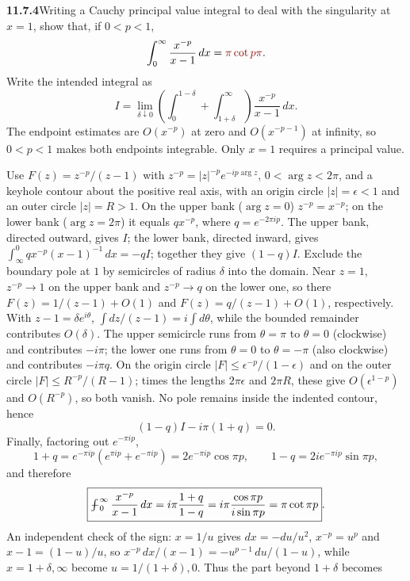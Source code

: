 \par\bigskip
\noindent\textbf{11.7.4}\quad Writing a Cauchy principal value integral to
deal with the singularity at $x=1$, show that, if $0 < p < 1$,
\[
\int_{0}^{\infty}\frac{x^{-p}}{x-1}\,dx=\erratum{\pi\cot p\pi}.
\]
\solution
{}
Write the intended integral as
\[
I=\lim_{\delta\downarrow0}
\left(\int_0^{1-\delta}+\int_{1+\delta}^{\infty}\right)
\frac{x^{-p}}{x-1}\,dx.
\]
The endpoint estimates are $O(x^{-p})$ at zero and $O(x^{-p-1})$
at infinity, so $0<p<1$ makes both endpoints integrable. Only $x=1$
requires a principal value.

Use $F(z)=z^{-p}/(z-1)$ with $z^{-p}=|z|^{-p}e^{-ip\arg z}$,
$0<\arg z<2\pi$, and a keyhole contour about the positive real axis,
with an origin circle $|z|=\epsilon<1$ and an outer circle $|z|=R>1$.
On the upper bank ($\arg z=0$) $z^{-p}=x^{-p}$; on the lower bank
($\arg z=2\pi$) it equals $q x^{-p}$, where $q=e^{-2\pi ip}$.
The upper bank, directed outward, gives $I$; the lower bank, directed
inward, gives $\int_\infty^0 qx^{-p}(x-1)^{-1}\,dx=-qI$; together they
give $(1-q)I$. Exclude the boundary pole at $1$ by semicircles of
radius $\delta$ into the domain. Near $z=1$, $z^{-p}\to1$ on the upper
bank and $z^{-p}\to q$ on the lower one, so there
$F(z)=1/(z-1)+O(1)$ and $F(z)=q/(z-1)+O(1)$, respectively. With
$z-1=\delta e^{i\theta}$, $\int dz/(z-1)=i\int d\theta$, while the
bounded remainder contributes $O(\delta)$. The upper semicircle runs
from $\theta=\pi$ to $\theta=0$ (clockwise) and contributes $-i\pi$; the
lower one runs from $\theta=0$ to $\theta=-\pi$ (also clockwise) and
contributes $-i\pi q$. On the origin circle
$|F|\le\epsilon^{-p}/(1-\epsilon)$ and on the outer circle
$|F|\le R^{-p}/(R-1)$; times the lengths $2\pi\epsilon$ and $2\pi R$,
these give $O(\epsilon^{1-p})$ and $O(R^{-p})$, so both vanish. No pole
remains inside the indented contour, hence
\[
(1-q)I-i\pi(1+q)=0.
\]
Finally, factoring out $e^{-\pi ip}$,
\[
1+q=e^{-\pi ip}(e^{\pi ip}+e^{-\pi ip})=2e^{-\pi ip}\cos\pi p,\qquad
1-q=2ie^{-\pi ip}\sin\pi p,
\]
and therefore
\[
\boxed{\PVint_0^\infty\frac{x^{-p}}{x-1}\,dx
=i\pi\frac{1+q}{1-q}=i\pi\frac{\cos\pi p}{i\sin\pi p}=\pi\cot\pi p}.
\]
An independent check of the sign: $x=1/u$ gives $dx=-du/u^2$,
$x^{-p}=u^p$ and $x-1=(1-u)/u$, so
$x^{-p}\,dx/(x-1)=-u^{p-1}\,du/(1-u)$, while $x=1+\delta,\infty$
become $u=1/(1+\delta),0$. Thus the part beyond $1+\delta$ becomes

